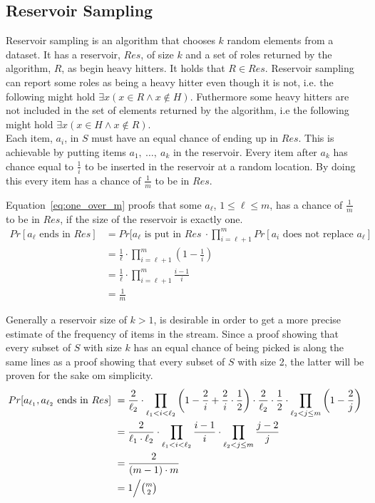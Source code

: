 \subsection{Reservoir Sampling}
\label{sub:reservoir}
Reservoir sampling is an algorithm that chooses \(k\) random elements from a dataset. It has a reservoir, \(Res\), of size \(k\) and a set of roles returned by the algorithm, \(R\), as begin heavy hitters. It holds that \(R \in Res\). Reservoir sampling can report some roles as being a heavy hitter even though it is not, i.e. the following might hold \(\exists x \left(x \in R \land x \notin H \right)\). Futhermore some heavy hitters are not included in the set of elements returned by the algorithm, i.e the following might hold \(\exists x \left(x \in H \land x \notin R \right)\).\\
Each item, \(a_i\), in \(S\) must have an equal chance of ending up in \(Res\). This is achievable by putting items \(a_1,\ \dots,\ a_k\) in the reservoir. Every item after \(a_k\) has chance equal to \(\frac{1}{i}\) to be inserted in the reservoir at a random location. By doing this every item has a chance of \(\frac{1}{m}\) to be in \(Res\).

Equation~\ref{eq:one_over_m} proofs that some \(a_\ell\), \(1 \le \ell \le m\), has a chance of \(\frac{1}{m}\) to be in \(Res\), if the size of the reservoir is exactly one.
\begin{equation}
	\label{eq:one_over_m}
	\begin{split}
	Pr[a_\ell \textrm{ ends in } Res]\ 
	& = Pr[a_\ell \textrm{ is put in } Res\ \cdot \prod_{i=\ell+1}^{m} Pr[a_i \textrm{ does not replace } a_\ell] \\
	& = \frac{1}{\ell} \cdot \prod_{i=\ell+1}^{m}\left(1-\frac{1}{i}\right) \\
	& = \frac{1}{\ell} \cdot \prod_{i=\ell+1}^{m}\frac{i-1}{i} \\
	& = \frac{1}{m}
	\end{split}
\end{equation}

Generally a reservoir size of \(k > 1\), is desirable in order to get a more precise estimate of the frequency of items in the stream. Since a proof showing that every subset of \(S\) with size \(k\) has an equal chance of being picked is along the same lines as a proof showing that every subset of \(S\) with size 2, the latter will be proven for the sake om simplicity.
\begin{equation}
	\label{eq:one_over_m2}
	\begin{split}
	Pr[a_{\ell_1}, a_{\ell_2} \textrm{ ends in } Res]\ 
	& = \frac{2}{\ell_2} \cdot \prod_{\ell_1<i<\ell_2} \left(1- \frac{2}{i} + \frac{2}{i} \cdot \frac{1}{2}\right) \cdot \frac{2}{\ell_2} \cdot \frac{1}{2} \cdot \prod_{\ell_2 < j \le m} \left( 1 - \frac{2}{j} \right)  \\
	& = \frac{2}{\ell_1 \cdot \ell_2} \cdot \prod_{\ell_1 < i < \ell_2} \frac{i-1}{i} \cdot \prod_{\ell_2 < j \le m} \frac{j-2}{j} \\
	& = \frac{2}{\left( m - 1 \right) \cdot m} \\
	& = 1\Big/\tbinom{m}{2}
	\end{split}
\end{equation}

